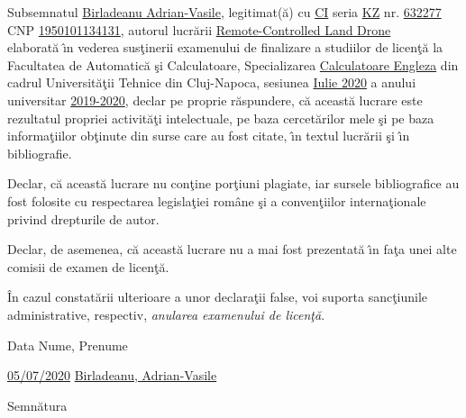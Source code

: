 \documentclass[12pt,a4paper,twoside]{report}
\renewcommand{\thesistitle}{Remote-Controlled Land Drone}
\begin{document}
Subsemnatul
\underline{Birladeanu Adrian-Vasile},
legitimat(\u{a}) cu \underline{CI} seria \underline{KZ} nr. \underline{632277}\\
CNP \underline{1950101134131}, autorul lucr\u{a}rii \underline{\thesistitle}\\
elaborat\u{a} \^{\i}n vederea sus\c{t}inerii examenului de finalizare a studiilor de licen\c{t}\u{a} la Facultatea de Automatic\u{a} \c{s}i Calculatoare, Specializarea \underline{Calculatoare Engleza} din cadrul Universit\u{a}\c{t}ii Tehnice din Cluj-Napoca, sesiunea \underline{Iulie 2020} a anului universitar \underline{2019-2020}, declar pe proprie r\u{a}spundere, c\u{a} aceast\u{a} lucrare este rezultatul propriei activit\u{a}\c{t}i intelectuale, pe baza cercet\u{a}rilor mele \c{s}i pe baza informa\c{t}iilor ob\c{t}inute din surse care au fost citate, \^{\i}n textul lucr\u{a}rii \c{s}i \^{\i}n bibliografie.

Declar, c\u{a} aceast\u{a} lucrare nu con\c{t}ine por\c{t}iuni plagiate, iar sursele bibliografice au fost folosite cu 
respectarea legisla\c{t}iei rom\^{a}ne \c{s}i a conven\c{t}iilor interna\c{t}ionale privind drepturile de autor.

Declar, de asemenea, c\u{a} aceast\u{a} lucrare nu a mai fost prezentat\u{a} \^{\i}n fa\c{t}a unei alte comisii de examen de licen\c{t}\u{a}.

\^{I}n cazul constat\u{a}rii ulterioare a unor declara\c{t}ii false, voi suporta sanc\c{t}iunile administrative, respectiv, \emph{anularea examenului de licen\c{t}\u{a}}.

\vspace{1.5cm}

Data \hspace{8cm} Nume, Prenume

\vspace{0.5cm}

\underline{05/07/2020} \hspace{5cm} \underline{Birladeanu, Adrian-Vasile}

\vspace{0.5cm}
\hspace{9.4cm}Semn\u{a}tura

\thispagestyle{empty}

\newpage





\tableofcontents
\newpage



















 


%
\end{document}
